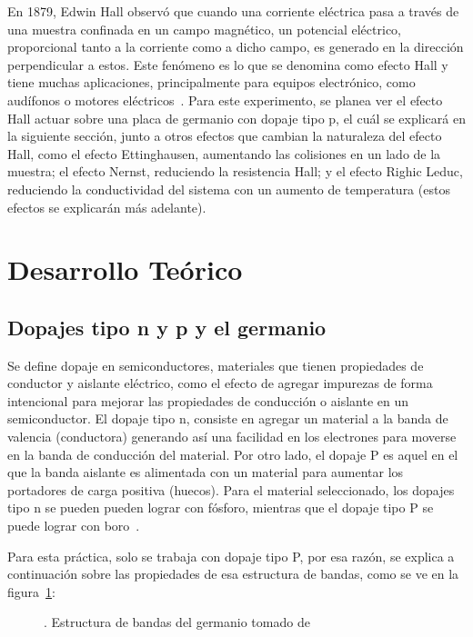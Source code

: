 \documentclass[%
 reprint,
 amsmath,amssymb,
 aps,
]{revtex4-1}
\begin{document}
 En 1879, Edwin Hall observó que cuando una corriente eléctrica pasa a través de una muestra confinada en un campo magnético, un potencial eléctrico, proporcional tanto a la corriente como a dicho campo, es generado en la dirección perpendicular a estos. Este fenómeno es lo que se denomina como efecto Hall y tiene muchas aplicaciones, principalmente para equipos electrónico, como audífonos o motores eléctricos~\cite{Efecto Hall}. Para este experimento, se planea ver el efecto Hall actuar sobre una placa de germanio con dopaje tipo p, el cuál se explicará en la siguiente sección, junto a otros efectos que cambian la naturaleza del efecto Hall, como el efecto Ettinghausen, aumentando las colisiones en un lado de la muestra; el efecto Nernst, reduciendo la resistencia Hall; y el efecto Righic Leduc, reduciendo la conductividad del sistema con un aumento de temperatura (estos efectos se explicarán más adelante).

 \section{Desarrollo Teórico}
 
 \subsection{Dopajes tipo n y p y el germanio}
 
 Se define dopaje en semiconductores, materiales que tienen propiedades de conductor y aislante eléctrico, como el efecto de agregar impurezas de forma intencional para mejorar las propiedades de conducción o aislante en un semiconductor. El dopaje tipo n, consiste en agregar un material a la banda de valencia (conductora) generando así una facilidad en los electrones para moverse en la banda de conducción del material. Por otro lado, el dopaje P es aquel en el que la banda aislante es alimentada con un material para aumentar los portadores de carga positiva (huecos).  Para el material seleccionado, los dopajes tipo n se pueden pueden lograr con fósforo, mientras que el dopaje tipo P se puede lograr con boro~\cite{doping}.
 
 Para esta práctica, solo se trabaja con dopaje tipo P, por esa razón, se explica a continuación sobre las propiedades de esa estructura de bandas, como se ve en la figura~\ref{bandstructure}:
 
 \begin{figure}[h]
\caption{\label{bandstructure}. Estructura de bandas del germanio tomado de~\cite{estructura de banda}}
\end{figure}
\end{document}
